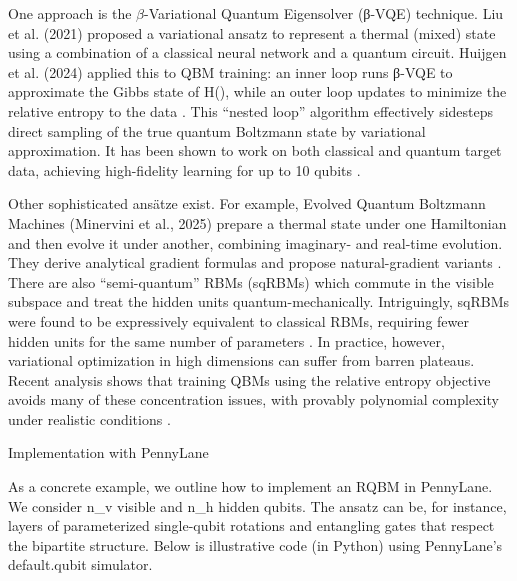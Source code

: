 One approach is the $\beta$-Variational Quantum Eigensolver (β-VQE) technique.  Liu et al. (2021) proposed a variational ansatz to represent a thermal (mixed) state using a combination of a classical neural network and a quantum circuit.  Huijgen et al. (2024) applied this to QBM training: an inner loop runs β-VQE to approximate the Gibbs state of H(\theta), while an outer loop updates \theta to minimize the relative entropy to the data .  This “nested loop” algorithm effectively sidesteps direct sampling of the true quantum Boltzmann state by variational approximation.  It has been shown to work on both classical and quantum target data, achieving high-fidelity learning for up to 10 qubits .



Other sophisticated ansätze exist.  For example, Evolved Quantum Boltzmann Machines (Minervini et al., 2025) prepare a thermal state under one Hamiltonian and then evolve it under another, combining imaginary- and real-time evolution.  They derive analytical gradient formulas and propose natural-gradient variants .  There are also “semi-quantum” RBMs (sqRBMs) which commute in the visible subspace and treat the hidden units quantum-mechanically.  Intriguingly, sqRBMs were found to be expressively equivalent to classical RBMs, requiring fewer hidden units for the same number of parameters . In practice, however, variational optimization in high dimensions can suffer from barren plateaus. Recent analysis shows that training QBMs using the relative entropy objective avoids many of these concentration issues, with provably polynomial complexity under realistic conditions .





Implementation with PennyLane





As a concrete example, we outline how to implement an RQBM in PennyLane. We consider n_v visible and n_h hidden qubits. The ansatz can be, for instance, layers of parameterized single-qubit rotations and entangling gates that respect the bipartite structure.  Below is illustrative code (in Python) using PennyLane’s default.qubit simulator.



